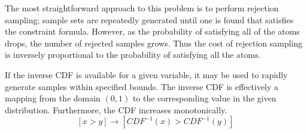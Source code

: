 
The  most  straightforward approach  to  this  problem  is to  perform
rejection sampling; sample sets  are repeatedly generated until one is
found  that  satisfies  the   constraint  formula.   However,  as  the
probability  of satisfying  all  of  the atoms  drops,  the number  of
rejected  samples  grows.  Thus  the  cost  of  rejection sampling  is
inversely proportional to the probability of satisfying all the atoms.

If the inverse  CDF is available for a given variable,  it may be used
to rapidly generate samples  within specified bounds.  The inverse CDF
is effectively a mapping from  the domain $(0,1)$ to the corresponding
value  in  the given  distribution.   Furthermore,  the CDF  increases
monotonically.
$$[x > y] \rightarrow \left[CDF^{-1}(x) > CDF^{-1}(y)\right]$$

